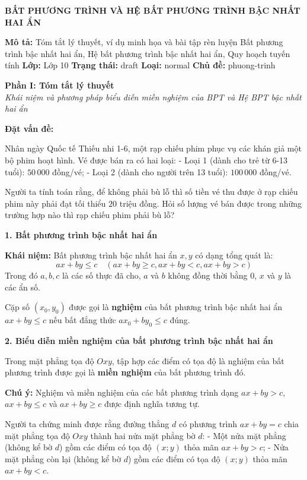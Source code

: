 \documentclass[12pt,a4paper]{article}
\newcommand{\doctitle}[1]{\begin{center}\Large\textbf{#1}\end{center}}
\newcommand{\docdesc}[1]{\textbf{Mô tả:} #1}
\newcommand{\docgrade}[1]{\textbf{Lớp:} #1}
\newcommand{\docstatus}[1]{\textbf{Trạng thái:} #1}
\newcommand{\doctype}[1]{\textbf{Loại:} #1}
\newcommand{\doctopics}[1]{\textbf{Chủ đề:} #1}
\newenvironment{lesson}[2]{
	\noindent\textbf{\Large #1}\\
	\textit{#2}
}{}
\begin{document}
\doctitle{BẤT PHƯƠNG TRÌNH VÀ HỆ BẤT PHƯƠNG TRÌNH BẬC NHẤT HAI ẨN}
\docdesc{Tóm tắt lý thuyết, ví dụ minh họa và bài tập rèn luyện Bất phương trình bậc nhất hai ẩn, Hệ bất phương trình bậc nhất hai ẩn, Quy hoạch tuyến tính}
\docgrade{Lớp 10}
\docstatus{draft}
\doctype{normal}
\doctopics{phuong-trinh}


\begin{lesson}{Phần I: Tóm tắt lý thuyết}{Khái niệm và phương pháp biểu diễn miền nghiệm của BPT và Hệ BPT bậc nhất hai ẩn}

\textbf{Đặt vấn đề:}

Nhân ngày Quốc tế Thiếu nhi 1-6, một rạp chiếu phim phục vụ các khán giả một bộ phim hoạt hình. Vé được bán ra có hai loại:
- Loại 1 (dành cho trẻ từ 6-13 tuổi): $50\,000$ đồng/vé;
- Loại 2 (dành cho người trên 13 tuổi): $100\,000$ đồng/vé.

Người ta tính toán rằng, để không phải bù lỗ thì số tiền vé thu được ở rạp chiếu phim này phải đạt tối thiểu $20$ triệu đồng. Hỏi số lượng vé bán được trong những trường hợp nào thì rạp chiếu phim phải bù lỗ?

\textbf{1. Bất phương trình bậc nhất hai ẩn}

\textbf{Khái niệm:}
Bất phương trình bậc nhất hai ẩn $x, y$ có dạng tổng quát là:
$$ax + by \le c \quad (ax + by \ge c, ax + by < c, ax + by > c)$$
Trong đó $a, b, c$ là các số thực đã cho, $a$ và $b$ không đồng thời bằng $0$, $x$ và $y$ là các ẩn số.

Cặp số $(x_0, y_0)$ được gọi là \textbf{nghiệm} của bất phương trình bậc nhất hai ẩn $ax + by \le c$ nếu bất đẳng thức $ax_0 + by_0 \le c$ đúng.

\textbf{2. Biểu diễn miền nghiệm của bất phương trình bậc nhất hai ẩn}

Trong mặt phẳng tọa độ $Oxy$, tập hợp các điểm có tọa độ là nghiệm của bất phương trình được gọi là \textbf{miền nghiệm} của bất phương trình đó.

\textbf{Chú ý:} Nghiệm và miền nghiệm của các bất phương trình dạng $ax + by > c$, $ax + by \le c$ và $ax + by \ge c$ được định nghĩa tương tự.

Người ta chứng minh được rằng đường thẳng $d$ có phương trình $ax + by = c$ chia mặt phẳng tọa độ $Oxy$ thành hai nửa mặt phẳng bờ $d$:
- Một nửa mặt phẳng (không kể bờ $d$) gồm các điểm có tọa độ $(x; y)$ thỏa mãn $ax + by > c$;
- Nửa mặt phẳng còn lại (không kể bờ $d$) gồm các điểm có tọa độ $(x; y)$ thỏa mãn $ax + by < c$.


\end{lesson}
\end{document}
